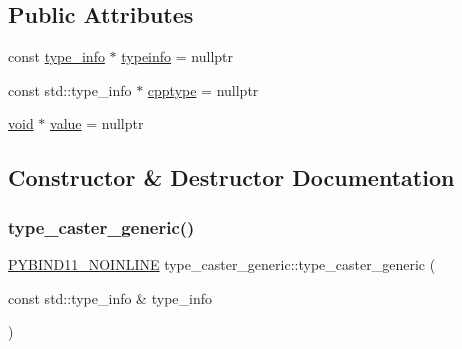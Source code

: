 \subsection*{Public Attributes}
\begin{DoxyCompactItemize}
\item 
const \mbox{\hyperlink{structtype__info}{type\+\_\+info}} $\ast$ \mbox{\hyperlink{classtype__caster__generic_ae0fcfb286c3f28721b89b077a9e1fe6d}{typeinfo}} = nullptr
\item 
const std\+::type\+\_\+info $\ast$ \mbox{\hyperlink{classtype__caster__generic_a933477d5828f6dd91375131d4af086ff}{cpptype}} = nullptr
\item 
\mbox{\hyperlink{_s_d_l__opengles2__gl2ext_8h_ae5d8fa23ad07c48bb609509eae494c95}{void}} $\ast$ \mbox{\hyperlink{classtype__caster__generic_a077b8d1e4af829443b2e41c3e5786f4d}{value}} = nullptr
\end{DoxyCompactItemize}


\subsection{Constructor \& Destructor Documentation}
\mbox{\label{classtype__caster__generic_a596f9ddd637dc921c7e19a1a8438f0a8}} 
\subsubsection{\texorpdfstring{type\_caster\_generic()}{type\_caster\_generic()}\hspace{0.1cm}{\footnotesize\ttfamily [1/2]}}
{\footnotesize\ttfamily \mbox{\hyperlink{detail_2common_8h_a1fb186b7494d5c576d902c0730ecbb71}{P\+Y\+B\+I\+N\+D11\+\_\+\+N\+O\+I\+N\+L\+I\+NE}} type\+\_\+caster\+\_\+generic\+::type\+\_\+caster\+\_\+generic (\begin{DoxyParamCaption}\item[{const std\+::type\+\_\+info \&}]{type\+\_\+info }\end{DoxyParamCaption})\hspace{0.3cm}{\ttfamily [inline]}}

\mbox{\label{classtype__caster__generic_a1d732714e600767de350cb3c6c8bb291}} 
